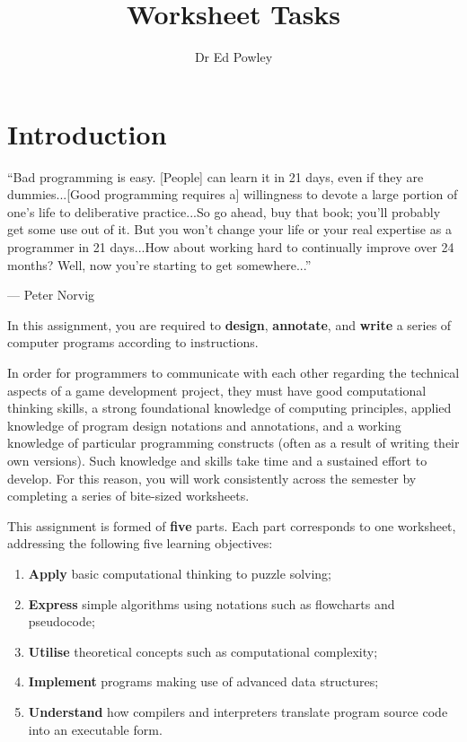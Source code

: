 \documentclass{../fal_assignment}
\title{Worksheet Tasks}
\author{Dr Ed Powley}
\begin{document}
\maketitle

\section*{Introduction}

\begin{marginquote}
``Bad programming is easy. [People] can learn it in 21 days, even if they are dummies...[Good programming requires a] willingness to devote a large portion of one's life to deliberative practice...So go ahead, buy that book; you'll probably get some use out of it. But you won't change your life or your real expertise as a programmer in 21 days...How about working hard to continually improve over 24 months? Well, now you're starting to get somewhere...''
\par --- Peter Norvig
\end{marginquote}

In this assignment, you are required to \textbf{design}, \textbf{annotate}, and \textbf{write} a series of computer programs according to instructions.

In order for programmers to communicate with each other regarding the technical aspects of a game development project, they must have good computational thinking skills, a strong foundational knowledge of computing principles, applied knowledge of program design notations and annotations, and a working knowledge of particular programming constructs (often as a result of writing their own versions). Such knowledge and skills take time and a sustained effort to develop. For this reason, you will work consistently across the semester by completing a series of bite-sized worksheets.

This assignment is formed of \textbf{five} parts.
Each part corresponds to one worksheet, addressing the following five learning objectives:
\begin{enumerate}[label=(\Alph*)]
	\item \textbf{Apply} basic computational thinking to puzzle solving;
	\item \textbf{Express} simple algorithms using notations such as flowcharts and pseudocode;
	\item \textbf{Utilise} theoretical concepts such as computational complexity;
	\item \textbf{Implement} programs making use of advanced data structures;
	\item \textbf{Understand} how compilers and interpreters translate program source code into an executable form.
\end{enumerate}
\end{document}

